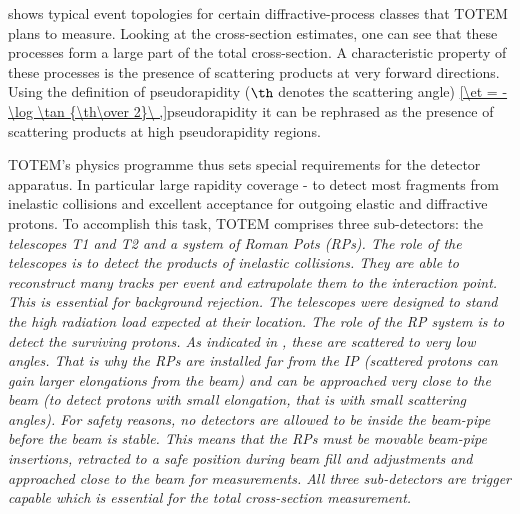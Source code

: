  shows typical event topologies for certain diffractive-process classes that TOTEM plans to measure. Looking at the cross-section estimates, one can see that these processes form a large part of the total cross-section. A characteristic property of these processes is the presence of scattering products at very forward directions. Using the definition of pseudorapidity ($\th$ denotes the scattering angle)
\eqref{\et = - \log \tan {\th\over 2}\ ,}{pseudorapidity}
it can be rephrased as the presence of scattering products at high pseudorapidity regions. 



TOTEM's physics programme thus sets special requirements for the detector apparatus. In particular large rapidity coverage - to detect most fragments from inelastic collisions and excellent acceptance for outgoing elastic and diffractive protons. To accomplish this task, TOTEM comprises three sub-detectors: the \em{telescopes T1 and T2} and a system of \em{Roman Pots} (RPs). The role of the telescopes is to detect the products of inelastic collisions. They are able to reconstruct many tracks per event and extrapolate them to the interaction point. This is essential for background rejection. The telescopes were designed to stand the high radiation load expected at their location. The role of the RP system is to detect the surviving protons. As indicated in , these are scattered to very low angles. That is why the RPs are installed far from the IP (scattered protons can gain larger elongations from the beam) and can be approached very close to the beam (to detect protons with small elongation, that is with small scattering angles). For safety reasons, no detectors are allowed to be inside the beam-pipe before the beam is stable. This means that the RPs must be movable beam-pipe insertions, retracted to a safe position during beam fill and adjustments and approached close to the beam for measurements. All three sub-detectors are trigger capable which is essential for the total cross-section measurement.



